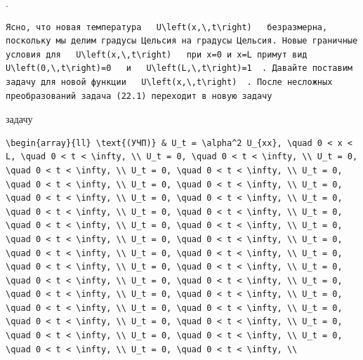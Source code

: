 \documentclass[
  ukrainian,
]{article}
\begin{document}
.

\begin{verbatim}
Ясно, что новая температура   U\left(x,\,t\right)   безразмерна, поскольку мы делим градусы Цельсия на градусы Цельсия. Новые граничные условия для   U\left(x,\,t\right)   при x=0 и x=L примут вид   U\left(0,\,t\right)=0   и   U\left(L,\,t\right)=1  . Давайте поставим задачу для новой функции   U\left(x,\,t\right)  . После несложных преобразований задача (22.1) переходит в новую задачу
\end{verbatim}

задачу

\begin{verbatim}
\begin{array}{ll} \text{(УЧП)} & U_t = \alpha^2 U_{xx}, \quad 0 < x < L, \quad 0 < t < \infty, \\ U_t = 0, \quad 0 < t < \infty, \\ U_t = 0, \quad 0 < t < \infty, \\ U_t = 0, \quad 0 < t < \infty, \\ U_t = 0, \quad 0 < t < \infty, \\ U_t = 0, \quad 0 < t < \infty, \\ U_t = 0, \quad 0 < t < \infty, \\ U_t = 0, \quad 0 < t < \infty, \\ U_t = 0, \quad 0 < t < \infty, \\ U_t = 0, \quad 0 < t < \infty, \\ U_t = 0, \quad 0 < t < \infty, \\ U_t = 0, \quad 0 < t < \infty, \\ U_t = 0, \quad 0 < t < \infty, \\ U_t = 0, \quad 0 < t < \infty, \\ U_t = 0, \quad 0 < t < \infty, \\ U_t = 0, \quad 0 < t < \infty, \\ U_t = 0, \quad 0 < t < \infty, \\ U_t = 0, \quad 0 < t < \infty, \\ U_t = 0, \quad 0 < t < \infty, \\ U_t = 0, \quad 0 < t < \infty, \\ U_t = 0, \quad 0 < t < \infty, \\ U_t = 0, \quad 0 < t < \infty, \\ U_t = 0, \quad 0 < t < \infty, \\ U_t = 0, \quad 0 < t < \infty, \\ U_t = 0, \quad 0 < t < \infty, \\ U_t = 0, \quad 0 < t < \infty, \\ U_t = 0, \quad 0 < t < \infty, \\ U_t = 0, \quad 0 < t < \infty, \\ U_t = 0, \quad 0 < t < \infty, \\ U_t = 0, \quad 0 < t < \infty, \\ 
\end{verbatim}
\end{document}
